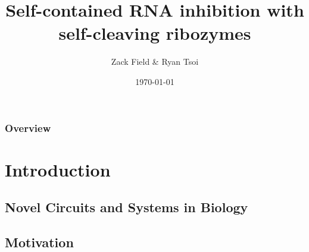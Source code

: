 \documentclass{beamer}
\title[RNA circuits]{Self-contained RNA inhibition with self-cleaving ribozymes} %
\author{Zack Field \& Ryan Tsoi} %
\institute[UC Berkeley] %
{
University of California \\ %
\medskip
\textit{field.zackery@berkeley.edu, } %
}
\date{\today} %
\begin{document}
\begin{frame}
\titlepage %
\end{frame}

\begin{frame}
\frametitle{Overview} %
\tableofcontents 
\end{frame}


\section{Introduction} %

\subsection{Novel Circuits and Systems in Biology} %

\begin{frame}
\frametitle{}
            

\end{frame}


\subsection{Motivation}
\end{document}
